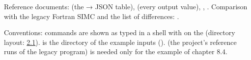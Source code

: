 \addtocounter{footnote}{-1}
Reference documents:  (the  → JSON table),  (every output value),
, . Comparison with the legacy Fortran SIMC and the list of differences:
.

Conventions: commands are shown as typed in a shell with  on the  (directory layout: \hyperref[user_manual-02u5finstallation:21-directory-layout-used-in-this-manual]{2.1}).  is the directory of the example inputs ().
 (the project's reference runs of the legacy program) is needed only for the example of chapter 8.4.

